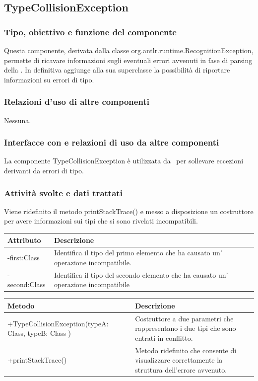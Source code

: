 \documentclass[11pt,titlepage,a4paper]{report}
\begin{document}
\subsection{TypeCollisionException}
\subsubsection{Tipo, obiettivo e funzione del componente}
Questa componente, derivata dalla classe org.antlr.runtime.RecognitionException, permette di ricavare informazioni sugli eventuali errori avvenuti in fase di parsing della \br. In definitiva aggiunge alla sua superclasse la possibilit\`a di riportare informazioni su errori di tipo.
\subsubsection{Relazioni d'uso di altre componenti}
Nessuna.
\subsubsection{Interfacce con e relazioni di uso da altre componenti}
La componente TypeCollisionException \`e utilizzata da \brp\ per sollevare eccezioni derivanti da errori di tipo.
\subsubsection{Attivit\`a svolte e dati trattati}
Viene ridefinito il metodo printStackTrace() e messo a disposizione un costruttore per avere informazioni sui tipi che si sono rivelati incompatibili.
\begin{center}
\begin{tabular}{||p{6cm}||p{6cm}||} \hline
\hline
Attributo & Descrizione \\  \hline
-first:Class & Identifica il tipo del primo elemento che ha causato un' operazione incompatibile. \\ \hline
-second:Class & Identifica il tipo del secondo elemento che ha causato un' operazione incompatibile \\ \hline
\end{tabular}
\end{center}
\begin{center}
\begin{tabular}{||p{6cm}||p{6cm}||} \hline
\hline
Metodo & Descrizione \\  \hline
+TypeCollisionException(typeA: Class, typeB: Class ) & Costruttore a due parametri che rappresentano i due tipi che sono entrati in conflitto.\\ \hline
+printStackTrace() & Metodo ridefinito che consente di visualizzare correttamente la struttura dell'errore avvenuto.\\ \hline
\end{tabular}
\end{center}
\end{document}
